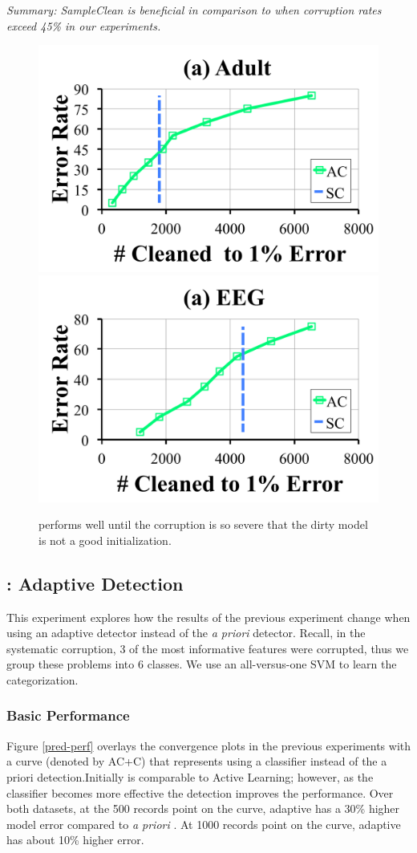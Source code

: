 \vspace{0.25em}

\noindent \emph{Summary: SampleClean is beneficial in comparison to \sys when corruption rates exceed 45\% in our experiments.}

\begin{figure}[ht!]
\centering\vspace{-2em}
 \includegraphics[width=0.49\columnwidth]{exp/exp9a.pdf}
  \includegraphics[width=0.49\columnwidth]{exp/exp9b.pdf}
 \caption{\sys performs well until the corruption is so severe that the dirty model is not a good initialization.  \label{bias}}
\end{figure}

\subsection{\sys: Adaptive Detection}
This experiment explores how the results of the previous experiment change when using an adaptive detector instead of the \emph{a priori} detector.
Recall, in the systematic corruption, 3 of the most informative features were corrupted, thus we group these problems into $6$ classes.
We use an all-versus-one SVM to learn the categorization.

\subsubsection{Basic Performance}
Figure \ref{pred-perf} overlays the convergence plots in the previous experiments with a curve (denoted by AC+C) that represents \sys using a classifier instead of the a priori detection.Initially \sys is comparable to Active Learning; however, as the classifier becomes more effective the detection improves the performance.
Over both datasets, at the 500 records point on the curve, adaptive \sys has a 30\% higher model error compared to \emph{a priori} \sys.
At 1000 records point on the curve, adaptive \sys has about 10\% higher error.

